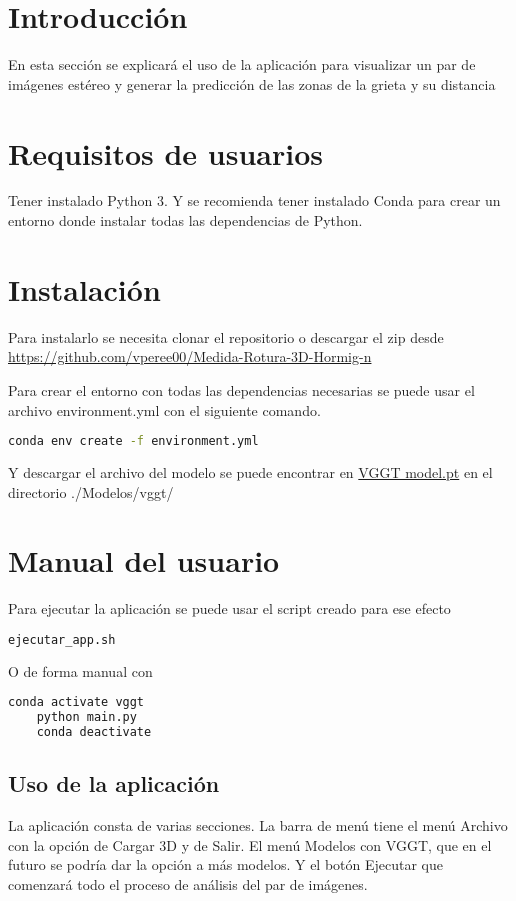 
\section{Introducción}
En esta sección se explicará el uso de la aplicación para visualizar un par de imágenes estéreo y generar la predicción de las zonas de la grieta y su distancia

\section{Requisitos de usuarios}
Tener instalado Python 3. Y se recomienda tener instalado Conda para crear un entorno donde instalar todas las dependencias de Python.

\section{Instalación}
Para instalarlo se necesita clonar el repositorio o descargar el zip desde \href{https://github.com/vperee00/Medida-Rotura-3D-Hormig-n/}{https://github.com/vperee00/Medida-Rotura-3D-Hormig-n}

Para crear el entorno con todas las dependencias necesarias se puede usar el archivo environment.yml con el siguiente comando.

\begin{lstlisting}[language=bash]
	conda env create -f environment.yml
\end{lstlisting}

Y descargar el archivo del modelo se puede encontrar en \href{https://huggingface.co/facebook/VGGT-1B/blob/main/model.pt}{VGGT model.pt} en el directorio ./Modelos/vggt/

\section{Manual del usuario}
Para ejecutar la aplicación se puede usar el script creado para ese efecto

\begin{lstlisting}[language=bash]
	ejecutar_app.sh
\end{lstlisting}

O de forma manual con 
\begin{lstlisting}[language=bash]
	conda activate vggt
	python main.py
	conda deactivate
\end{lstlisting}

\subsection{Uso de la aplicación}
La aplicación consta de varias secciones. La barra de menú tiene el menú Archivo con la opción de Cargar 3D y de Salir. El menú Modelos con VGGT, que en el futuro se podría dar la opción a más modelos. Y el botón Ejecutar que comenzará todo el proceso de análisis del par de imágenes.

